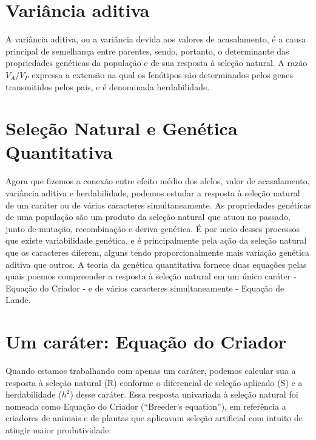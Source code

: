 \documentclass[portuges,]{tufte-handout}
\begin{document}
\section{Variância aditiva}\label{variuxe2ncia-aditiva}

A variância aditiva, ou a variância devida aos valores de acasalamento,
é a causa principal de semelhança entre parentes, sendo, portanto, o
determinante das propriedades genéticas da população e de sua resposta à
seleção natural. A razão \(V_A/V_P\) expressa a extensão na qual os
fenótipos são determinados pelos genes transmitidos pelos pais, e é
denominada herdabilidade.

\newpage

\section{Seleção Natural e Genética
Quantitativa}\label{seleuxe7uxe3o-natural-e-genuxe9tica-quantitativa}

Agora que fizemos a conexão entre efeito médio dos alelos, valor de
acasalamento, variância aditiva e herdabilidade, podemos estudar a
resposta à seleção natural de um caráter ou de vários caracteres
simultaneamente. As propriedades genéticas de uma população são um
produto da seleção natural que atuou no passado, junto de mutação,
recombinação e deriva genética. É por meio desses processos que existe
variabilidade genética, e é principalmente pela ação da seleção natural
que os caracteres diferem, alguns tendo proporcionalmente mais variação
genética aditiva que outros. A teoria da genética quantitativa fornece
duas equações pelas quais poemos compreender a resposta à seleção
natural em um único caráter - Equação do Criador - e de vários
caracteres simultaneamente - Equação de Lande.

\section{Um caráter: Equação do
Criador}\label{um-caruxe1ter-equauxe7uxe3o-do-criador}

Quando estamos trabalhando com apenas um caráter, podemos calcular sua a
resposta à seleção natural (R) conforme o diferencial de seleção
aplicado (S) e a herdabilidade (\(h^2\)) desse caráter. Essa resposta
univariada à seleção natural foi nomeada como Equação do Criador
(``Breeder's equation''), em referência a criadores de animais e de
plantas que aplicavam seleção artificial com intuito de atingir maior
produtividade:
\end{document}
